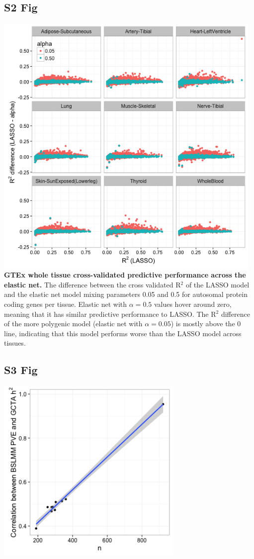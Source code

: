 \documentclass[10pt,letterpaper]{article}
\begin{document}
\begin{singlespace}
\subsection*{S2 Fig}
\includegraphics[width=13cm]{Figures/GenArch_Supp/S2Fig.png}
\label{S2_Fig}
{\bf GTEx whole tissue cross-validated predictive performance across the elastic net.} The difference between the cross validated R$^2$ of the LASSO model and the elastic net model mixing parameters 0.05 and 0.5 for autosomal protein coding genes per tissue. Elastic net with $\alpha=0.5$ values hover around zero, meaning that it has similar predictive performance to LASSO. The R$^2$ difference of the more polygenic model (elastic net with $\alpha=0.05$) is mostly above the 0 line, indicating that this model performs worse than the LASSO model across tissues.

\subsection*{S3 Fig}
\includegraphics[width=9cm]{Figures/Fig-R_gcta_bslmm_v_n.png}
\label{S3_Fig}


\end{singlespace}
\end{document}
